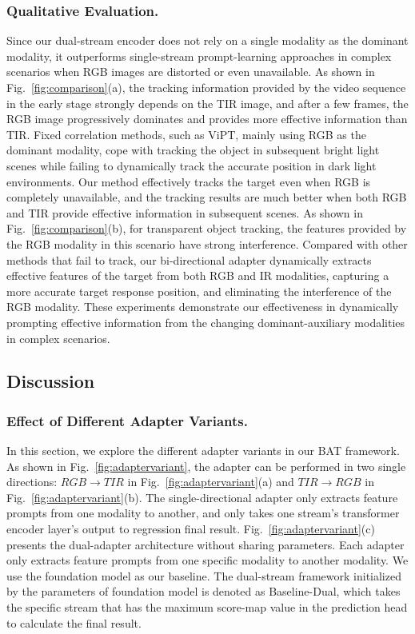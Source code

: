 \documentclass[letterpaper]{article} %
\begin{document}
\subsubsection{Qualitative Evaluation.}
Since our dual-stream encoder does not rely on a single modality as the dominant modality, it outperforms single-stream prompt-learning approaches in complex scenarios when RGB images are distorted or even unavailable.
As shown in Fig.~\ref{fig:comparison}(a), the tracking information provided by the video sequence in the early stage strongly depends on the TIR image, and after a few frames, the RGB image progressively dominates and provides more effective information than TIR. Fixed correlation methods, such as ViPT, mainly using RGB as the dominant modality, cope with tracking the object in subsequent bright light scenes while failing to dynamically track the accurate position in dark light environments. Our method effectively tracks the target even when RGB is completely unavailable, and the tracking results are much better when both RGB and TIR provide effective information in subsequent scenes.
As shown in Fig.~\ref{fig:comparison}(b), for transparent object tracking, the features provided by the RGB modality in this scenario have strong interference. Compared with other methods that fail to track, our bi-directional adapter dynamically extracts effective features of the target from both RGB and IR modalities, capturing a more accurate target response position, and eliminating the interference of the RGB modality.
These experiments demonstrate our effectiveness in dynamically prompting effective information from the changing dominant-auxiliary modalities in complex scenarios.







\subsection{Discussion}


\subsubsection{Effect of Different Adapter Variants.}

In this section, we explore the different adapter variants in our BAT framework. As shown in Fig.~\ref{fig:adaptervariant}, the adapter can be performed in two single directions: $RGB\rightarrow TIR$ in Fig.~\ref{fig:adaptervariant}(a) and $TIR\rightarrow RGB$ in Fig.~\ref{fig:adaptervariant}(b).
The single-directional adapter only extracts feature prompts from one modality to another, and only takes one stream's transformer encoder layer's output to regression final result.
Fig.~\ref{fig:adaptervariant}(c) presents the dual-adapter architecture without sharing parameters. Each adapter only extracts feature prompts from one specific modality to another modality.
We use the foundation model as our baseline.
The dual-stream framework initialized by the parameters of foundation model is denoted as Baseline-Dual,
which takes the specific stream that has the maximum score-map value in the prediction head to calculate the final result.
\end{document}
